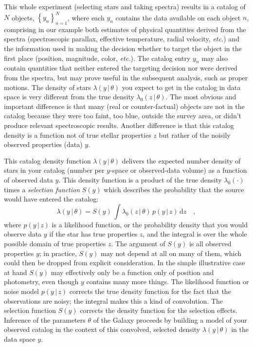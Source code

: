 \documentclass[modern]{aastex62}
\newcommand{\dd}{\mathrm{d}}
\newcommand{\given}{\,|\,}
\newcommand{\set}[1]{\left\{{#1}\right\}}
\newcommand{\foreign}[1]{\textsl{#1}}
\newcommand{\etc}{\foreign{etc.}}
\begin{document}
This whole experiment (selecting stars and taking spectra)
results in a catalog of $N$ objects,
$\set{y_n}_{n=1}^N$, where each $y_n$ contains the data available on
each object $n$, comprising in our example both estimates of physical
quantities derived from the spectra (spectroscopic parallax, effective
temperature, radial velocity, \etc) and the information used in making
the decision whether to target the object in the first place
(position, magnitude, color, \etc).
The catalog entry $y_n$ may also contain quantities that neither
entered the targeting decision nor were derived from the spectra, but
may prove useful in the subsequent analysis, such as proper motions.
The density of stars $\lambda(y\given\theta)$ you expect to get
in the catalog in data space
is very different from the true density $\lambda_0(z\given\theta)$.
The most obvious and important difference is that many (real or
counter-factual) objects are not in the catalog
because they were too faint, too blue, outside the survey area, or
didn't produce relevant spectroscopic results.
Another difference is that this catalog density
is a function not of true stellar properties $z$ but rather of the noisily
observed properties (data) $y$.

This catalog density function $\lambda(y\given\theta)$ delivers the expected number
density of stars in your catalog (number per $y$-space or observed-data volume)
as a function of observed data $y$.
This density function is a product of the true density $\lambda_0(\cdot)$
times a \emph{selection function} $S(y)$ which describes the
probability that the source would have entered the catalog:
\begin{equation}
\lambda(y\given\theta) = S(y)\,\int\lambda_0(z\given\theta)\,p(y\given z)\,\dd z
\quad,
\end{equation}
where $p(y\given z)$ is a likelihood function, or the probability
density that you would observe data $y$ if the star has true
properties $z$, and the integral is over the whole possible domain of
true properties $z$.
The argument of $S(y)$ is all observed properties $y$; in practice,
$S(y)$ may not depend at all on many of them, which could then be
dropped from explicit consideration.
In the simple illustrative case at hand $S(y)$ may effectively only be
a function only of position and photometry, even though $y$ contains
many more things.
The likelihood function or noise model $p(y\given z)$ corrects the true density function
for the fact that the observations are noisy; the integral makes this a
kind of convolution.
The selection function $S(y)$ corrects the density function for the
selection effects.
Inference of the parameters $\theta$ of the Galaxy proceeds by
building a model of your observed catalog in the context of this
convolved, selected density $\lambda(y\given\theta)$ in the data space
$y$.
\end{document}

